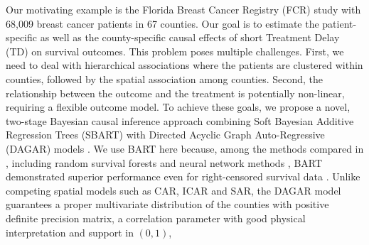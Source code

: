 \documentclass[aoas]{imsart}
\theoremstyle{plain}
\theoremstyle{definition}
\begin{document}
Our motivating example is the Florida Breast Cancer Registry (FCR) study with 68,009 breast cancer patients in 67 counties. Our goal is to estimate the patient-specific as well as the county-specific causal effects of short Treatment Delay (TD) on survival outcomes. This problem poses multiple challenges. First, we need to deal with hierarchical associations where the patients are clustered within counties, followed by the spatial association among counties. Second, the relationship between the outcome and the treatment is potentially non-linear, requiring a flexible outcome model. To achieve these goals, we propose a novel, two-stage Bayesian causal inference approach combining Soft Bayesian Additive Regression Trees (SBART) with Directed Acyclic Graph Auto-Regressive (DAGAR) models \parencite{datta2019dagar}. We use BART here because, among the methods compared in \parencite{hu2021estimating}, including random survival forests \parencite{Ishwaran08} and neural network methods \parencite{katzman2018deep, kvamme2019time}, BART demonstrated superior performance even for right-censored survival data \parencite{hu2021estimating, henderson2020bayesian}.
 Unlike competing spatial models such as CAR, ICAR and SAR, the DAGAR model guarantees a proper multivariate distribution of the counties with positive definite precision matrix, a correlation parameter with good physical interpretation and support in $(0,1)$, 
\end{document}
